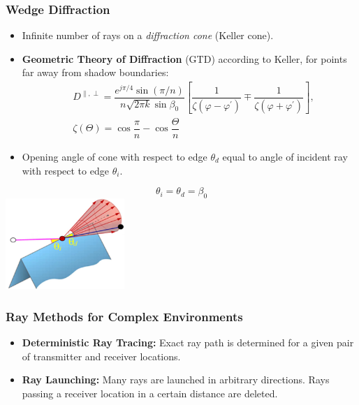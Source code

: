 \subsubsection{Wedge Diffraction}
\begin{itemize}
    \itemsep0pt
    \item Infinite number of rays on a \textit{diffraction cone} (Keller cone).
            \item \textbf{Geometric Theory of Diffraction} (GTD) according to Keller, for points far away from shadow boundaries:\\
                
                \begin{align*}
                    &D^{\parallel,\perp} = \dfrac{e^{j\pi/4} \sin(\pi/n)}{n\sqrt{2\pi k}\sin\beta_0}
                    \left[\dfrac{1}{\zeta(\varphi-\varphi^\prime)} \mp  \dfrac{1}{\zeta(\varphi+\varphi^\prime)}\right],\\
                    &\zeta(\Theta) = \cos\dfrac{\pi}{n} - \cos \dfrac{\Theta}{n}
                \end{align*}
    \item Opening angle of cone with respect to edge $\theta_d$ equal to angle of incident ray with respect to edge $\theta_i$.
\end{itemize}
\begin{center}
    \begin{equation*}
        \theta_i = \theta_d = \beta_0
    \end{equation*}
    \includegraphics[width=4.5cm]{content/aawp/pictures/keller_cone.png}
\end{center}
\subsubsection{Ray Methods for Complex Environments}
\begin{itemize}
    \itemsep0pt
    \item \textbf{Deterministic Ray Tracing:} Exact ray path is determined for a given pair of transmitter and receiver locations.
    \item \textbf{Ray Launching:} Many rays are launched in arbitrary directions. Rays passing a receiver location in a certain distance are deleted.
\end{itemize}
